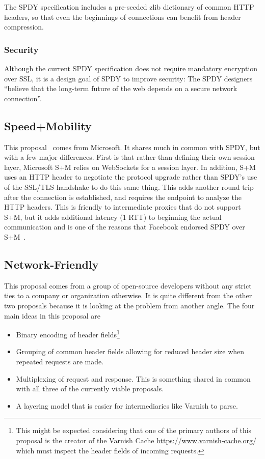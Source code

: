 \documentclass[10pt,letterpaper,notitlepage]{article}
\begin{document}
The SPDY specification includes a pre-seeded zlib dictionary of common HTTP
headers, so that even the beginnings of connections can benefit from header
compression.

\subsubsection{Security}
Although the current SPDY specification does not require mandatory encryption
over SSL, it is a design goal of SPDY to improve security: The SPDY designers
``believe that the long-term future of the web depends on a secure network
connection''\cite{spdy-whitepaper}.

\subsection{Speed+Mobility}
\label{sec:background/s+m}
This proposal~\cite{sm} comes from Microsoft.  It shares much in common with
SPDY, but with a few major differences. First is that rather than defining
their own session layer, Microsoft S+M relies on WebSockets for a session
layer.  In addition, S+M uses an HTTP header to negotiate the protocol upgrade
rather than SPDY's use of the SSL/TLS handshake to do this same thing. This
adds another round trip after the connection is established, and requires the
endpoint to analyze the HTTP headers. This is friendly to intermediate proxies
that do not support S+M, but it adds additional latency (1 RTT) to beginning
the actual communication and is one of the reasons that Facebook endorsed SPDY
over S+M~\cite{fbook}.

\subsection{Network-Friendly}
\label{sec:background/opensource}
This proposal comes from a group of open-source developers without any strict
ties to a company or organization otherwise.  It is quite different from the
other two proposals because it is looking at the problem from another angle.
The four main ideas in this proposal are~\cite{friendly}
\begin{itemize}
\item Binary encoding of header fields\footnote{This might be expected
considering that one of the primary authors of this proposal is the creator of
the Varnish Cache \url{https://www.varnish-cache.org/} which must inspect the
header fields of incoming requests.}
\item Grouping of common header fields allowing for reduced header size when
repeated requests are made.
\item Multiplexing of request and response.  This is something shared in common
with all three of the currently viable proposals.
\item A layering model that is easier for intermediaries like Varnish to parse.
\end{itemize}
\end{document}

